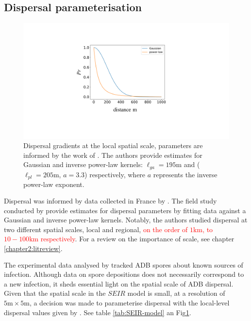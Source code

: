% 
 
\subsection{Dispersal parameterisation}

\begin{figure}
    \centering
    \includegraphics[scale=0.25]{chapter6/figures/fig2.pdf}
    \caption{Dispersal gradients at the local spatial scale, parameters are informed by the work of \cite{grosdidier2018tracking}. The authors provide estimates for Gaussian and inverse power-law kernels: $\ell_{ga} = 195\mathrm{m}$ and ($\ell_{pl} = 205\mathrm{m}$, $a=3.3$) respectively, where $a$ represents the inverse power-law exponent.}
    \label{fig:dispersal-parameterisation}
\end{figure}

Dispersal was informed by data collected in France by \cite{grosdidier2018tracking}. The field study conducted by \cite{grosdidier2018tracking} provide estimates for dispersal parameters by fitting data against a Gaussian and inverse power-law kernels. Notably, the authors studied dispersal at two different spatial scales, local and regional, \textcolor{red}{on the order of $1\mathrm{km}$, to $10-100 \mathrm{km}$ respectively}. For a review on the importance of scale, see chapter \ref{chapter2:litreview}. 

The experimental data analysed by \cite{grosdidier2018tracking} tracked ADB spores about known sources of infection. Although data on spore depositions does not necessarily correspond to a new infection, it sheds essential light on the spatial scale of ADB dispersal. Given that the spatial scale in the $SEIR$ model is small, at a  resolution of $5\mathrm{m} \times 5\mathrm{m}$, a decision was made to parameterise dispersal with the local-level dispersal values given by \cite{grosdidier2018tracking}. See table \ref{tab:SEIR-model} an Fig\ref{fig:dispersal-parameterisation}. 

